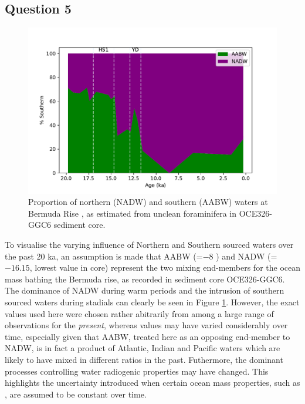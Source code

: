 \subsection{Question 5}
\label{sec:Q2.5}
\begin{figure}[h]
\includegraphics[width=\textwidth]{img/north_south}
    \caption{Proportion of northern (NADW) and southern (AABW) waters at Bermuda Rise , as estimated from unclean foraminifera \eNd{} in OCE326-GGC6 sediment core.}
    \label{fig:north_south}
\end{figure}


To visualise the varying influence of Northern and Southern sourced waters over the past 20 ka, an assumption is made that AABW (\eNd=$-8$ \parencite{garcia2014rare}) and NADW (\eNd=$-16.15$, lowest value in core) represent the two mixing end-members for the ocean mass bathing the Bermuda rise, as recorded in sediment core OCE326-GGC6.
The dominance of NADW during warm periods and the intrusion of southern sourced waters during stadials can clearly be seen in Figure \ref{fig:north_south}.
However, the exact values used here were chosen rather abitrarily from among a large range of observations for the \emph{present}, whereas values may have varied considerably over time, especially given that AABW, treated here as an opposing end-member to NADW, is in fact a product of Atlantic, Indian and Pacific waters which are likely to have mixed in different ratios in the past.
Futhermore, the dominant processes controlling water radiogenic properties may have changed.
This highlights the uncertainty introduced when certain ocean mass properties, such as \eNd{}, are assumed to be constant over time.
